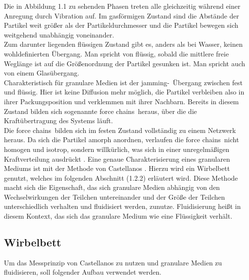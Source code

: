 Die in Abbildung 1.1 zu sehenden Phasen treten alle gleichzeitig während einer Anregung durch Vibration auf. Im gasförmigen Zustand sind die Abstände der Partikel weit größer als der Partikeldurchmesser und die Partikel bewegen sich weitgehend unabhängig voneinander. \\
Zum darunter liegenden flüssigen Zustand gibt es, anders als bei Wasser, keinen wohldefinierten Übergang. Man spricht von flüssig, sobald die mittlere freie Weglänge ist auf die Größenordnung der Partikel gesunken ist. Man spricht auch von einem Glasübergang. \\
Charakteristisch für granulare Medien ist der \glqq jamming\grqq-\ Übergang zwischen fest und flüssig. Hier ist keine Diffusion mehr möglich, die Partikel verbleiben also in ihrer Packungsposition und verklemmen mit ihrer Nachbarn. Bereits in diesem Zustand bilden sich sogenannte \glqq force chains\grqq \ heraus, über die die Kraftübertragung des Systems läuft. \\
Die \glqq force chains\grqq \ bilden sich im festen Zustand vollständig zu einem Netzwerk heraus. Da sich die Partikel amorph anordnen, verlaufen die \glqq force chains\grqq \ nicht homogen und isotrop, sondern willkürlich, was sich in einer unregelmäßigen Kraftverteilung ausdrückt \cite{Darmstadt2015, Fallturmexperiment}.
Eine genaue Charakterisierung eines granularen Mediums ist mit der Methode von Castellanos \cite{Castellanos2000}. Hierzu wird ein Wirbelbett genutzt, welches im folgenden Abschnitt (1.2.2) erläutert wird. Diese Methode macht sich die Eigenschaft, das sich granulare Medien abhängig von den Wechselwirkungen der Teilchen untereinander und der Größe der Teilchen unterschiedlich verhalten und fluidisiert werden, zunutze. Fluidisierung heißt in diesem Kontext, das sich das granulare Medium wie eine Flüssigkeit verhält.

\subsection{Wirbelbett}

Um das Messprinzip von Castellanos zu nutzen und granulare Medien zu fluidisieren, soll folgender Aufbau verwendet werden.


